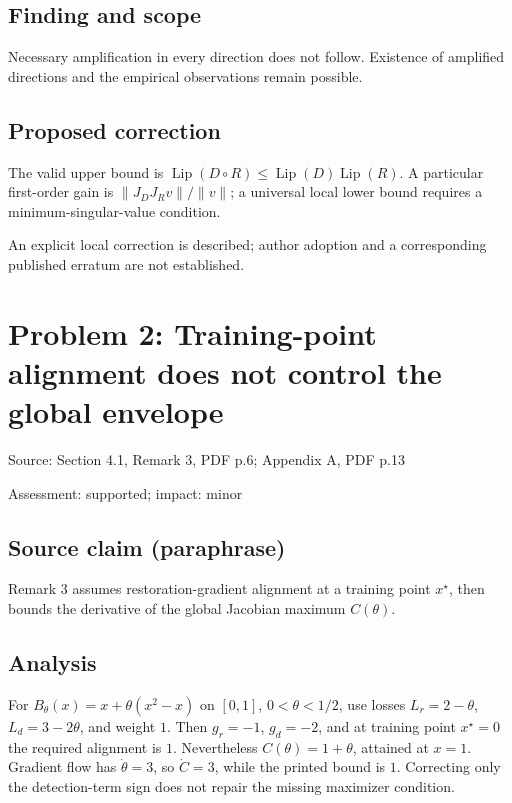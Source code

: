 \documentclass[11pt]{article}
\begin{document}
\subsection*{Finding and scope}

Necessary amplification in every direction does not follow. Existence of amplified directions and the empirical observations remain possible.

\subsection*{Proposed correction}

The valid upper bound is \(\operatorname{Lip}(D\circ R)\leq\operatorname{Lip}(D)\operatorname{Lip}(R)\). A particular first-order gain is \(\|J_DJ_Rv\|/\|v\|\); a universal local lower bound requires a minimum-singular-value condition.

An explicit local correction is described; author adoption and a corresponding published erratum are not established.

\section*{Problem 2: Training-point alignment does not control the global envelope}

Source: Section 4.1, Remark 3, PDF p.6; Appendix A, PDF p.13

Assessment: supported; impact: minor

\subsection*{Source claim (paraphrase)}

Remark 3 assumes restoration-gradient alignment at a training point \(x^\star\), then bounds the derivative of the global Jacobian maximum \(C(\theta)\).

\subsection*{Analysis}

For \(B_\theta(x)=x+\theta(x^2-x)\) on \([0,1]\), \(0<\theta<1/2\), use losses \(L_r=2-\theta\), \(L_d=3-2\theta\), and weight \(1\). Then \(g_r=-1\), \(g_d=-2\), and at training point \(x^\star=0\) the required alignment is \(1\). Nevertheless \(C(\theta)=1+\theta\), attained at \(x=1\). Gradient flow has \(\dot\theta=3\), so \(\dot C=3\), while the printed bound is \(1\). Correcting only the detection-term sign does not repair the missing maximizer condition.
\end{document}
